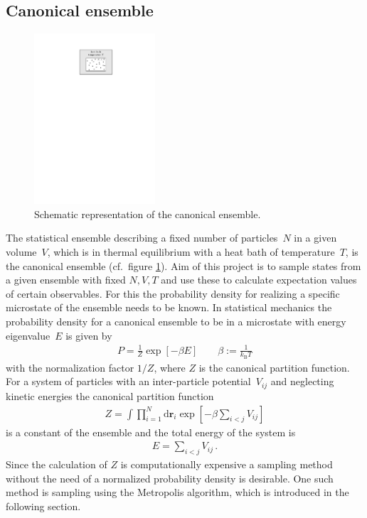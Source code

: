 \documentclass[11pt, a4paper]{article}
\numberwithin{equation}{section}
\begin{document}
\subsection{Canonical ensemble} \label{sec:Canonical_Ensemble}

\begin{figure}
	\centering
	\includegraphics[width=0.4\textwidth]{./figures/canonical_ensemble.pdf}
	\caption{Schematic representation of the canonical ensemble.}
	\label{fig:canonical_ensemble}
\end{figure}

The statistical ensemble describing a fixed number of particles~$N$ in a given volume~$V$, which is in thermal equilibrium with a heat bath of temperature~$T$, is the canonical ensemble (cf.\ figure \ref{fig:canonical_ensemble}).
Aim of this project is to sample states from a given ensemble with fixed $N, V, T$ and use these to calculate expectation values of certain observables.
For this the probability density for realizing a specific microstate of the ensemble needs to be known.
In statistical mechanics the probability density for a canonical ensemble to be in a microstate with energy eigenvalue~$E$ is given by \cite{schwabl}
\begin{align*}
	P = \frac{1}{Z} \exp\left[ -\beta E \right] \qquad \beta := \frac{1}{k_\mathrm{B} T}
\end{align*}
with the normalization factor $1/Z$, where $Z$ is the canonical partition function.
For a system of particles with an inter-particle potential~$V_{ij}$ and neglecting kinetic energies the canonical partition function
\begin{align*}
	Z = \int \prod_{i=1}^N \mathrm{d}\mathbf{r}_i \exp\left[ -\beta \sum_{i < j} V_{ij} \right]
\end{align*}
is a constant of the ensemble and the total energy of the system is
\begin{align*}
	E = \sum_{i < j} V_{ij} \, \text{.}
\end{align*}
Since the calculation of $Z$ is computationally expensive a sampling method without the need of a normalized probability density is desirable.
One such method is sampling using the Metropolis algorithm, which is introduced in the following section.
\end{document}
